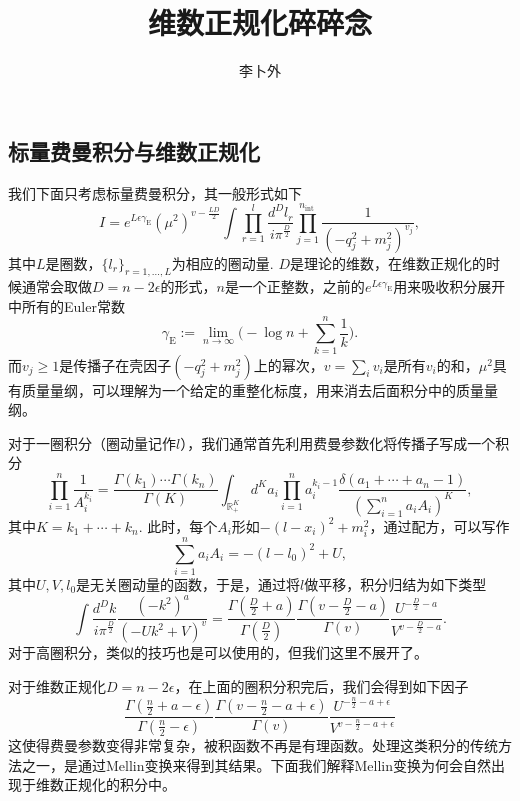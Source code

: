 \documentclass[12pt]{article}
\title{维数正规化碎碎念}
\author{李卜外}
\theoremstyle{definition}
\theoremstyle{plain}
\begin{document}
\maketitle

\subsection{标量费曼积分与维数正规化}

我们下面只考虑标量费曼积分，其一般形式如下
\[
	I=e^{L\epsilon \gamma_{\mathrm{E}}}\left(\mu^{2}\right)^{v-\frac{L D}{2}} \int \prod_{r=1}^{l} \frac{d^{D} l_{r}}{i \pi^{\frac{D}{2}}} \prod_{j=1}^{n_{\text {int }}} \frac{1}{\left(-q_{j}^{2}+m_{j}^{2}\right)^{v_{j}}},
\]
其中$L$是圈数，$\{l_r\}_{r=1,\dots,L}$为相应的圈动量. $D$是理论的维数，在维数正规化的时候通常会取做$D=n-2\epsilon$的形式，$n$是一个正整数，之前的$e^{L\epsilon \gamma_{\mathrm{E}}}$用来吸收积分展开中所有的Euler常数
\[
	\gamma_{\mathrm{E}}:=\lim_{n\to \infty}\biggl(-\log n+\sum_{k=1}^n\frac{1}{k}\biggr).
\]
而$v_j\geq 1$是传播子在壳因子$(-q_{j}^{2}+m_{j}^{2})$上的幂次，$v=\sum_i v_i$是所有$v_i$的和，$\mu^{2}$具有质量量纲，可以理解为一个给定的重整化标度，用来消去后面积分中的质量量纲。

对于一圈积分（圈动量记作$l$），我们通常首先利用费曼参数化将传播子写成一个积分
\[
	\prod_{i=1}^n\frac{1}{A_i^{k_i}}=\frac{\Gamma(k_1)\cdots \Gamma(k_n)}{\Gamma(K)}\int_{\mathbb R^K_+}d^K a_i \prod_{i=1}^n a_i^{k_i-1}\frac{\delta(a_1+\cdots+a_n-1)}{(\sum_{i=1}^n a_iA_i)^K},
\]
其中$K=k_1+\cdots+k_n$. 此时，每个$A_i$形如$-(l-x_i)^2+m_i^2$，通过配方，可以写作
\[
	\sum_{i=1}^n a_iA_i= -(l-l_0)^2+U,
\]
其中$U,V,l_0$是无关圈动量的函数，于是，通过将$l$做平移，积分归结为如下类型
\[
	\int \frac{d^{D} k}{i \pi^{\frac{D}{2}}} \frac{\left(-k^{2}\right)^{a}}{\left(-U k^{2}+V\right)^{v}}=\frac{\Gamma\left(\frac{D}{2}+a\right)}{\Gamma\left(\frac{D}{2}\right)} \frac{\Gamma\left(v-\frac{D}{2}-a\right)}{\Gamma(v)} \frac{U^{-\frac{D}{2}-a}}{V^{v-\frac{D}{2}-a}}.
\]
对于高圈积分，类似的技巧也是可以使用的，但我们这里不展开了。

对于维数正规化$D=n-2\epsilon$，在上面的圈积分积完后，我们会得到如下因子
\[
	\frac{\Gamma\left(\frac{n}{2}+a-\epsilon\right)}{\Gamma\left(\frac{n}{2}-\epsilon\right)} \frac{\Gamma\left(v-\frac{n}{2}-a+\epsilon\right)}{\Gamma(v)} \frac{U^{-\frac{n}{2}-a+\epsilon}}{V^{v-\frac{n}{2}-a+\epsilon}}
\]
这使得费曼参数变得非常复杂，被积函数不再是有理函数。处理这类积分的传统方法之一，是通过Mellin变换来得到其结果。下面我们解释Mellin变换为何会自然出现于维数正规化的积分中。
\end{document}
